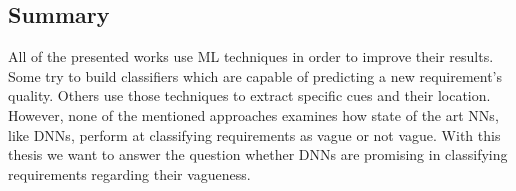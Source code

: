 \subsection{Summary}
All of the presented works use \ac{ML} techniques in order to improve their results.
Some try to build classifiers which are capable of predicting a new requirement's quality.
Others use those techniques to extract specific cues and their location.
However, none of the mentioned approaches examines how state of the art \acp{NN}, like \acp{DNN}, perform at classifying requirements as vague or not vague.
With this thesis we want to answer the question whether \acp{DNN} are promising in classifying requirements regarding their vagueness.
